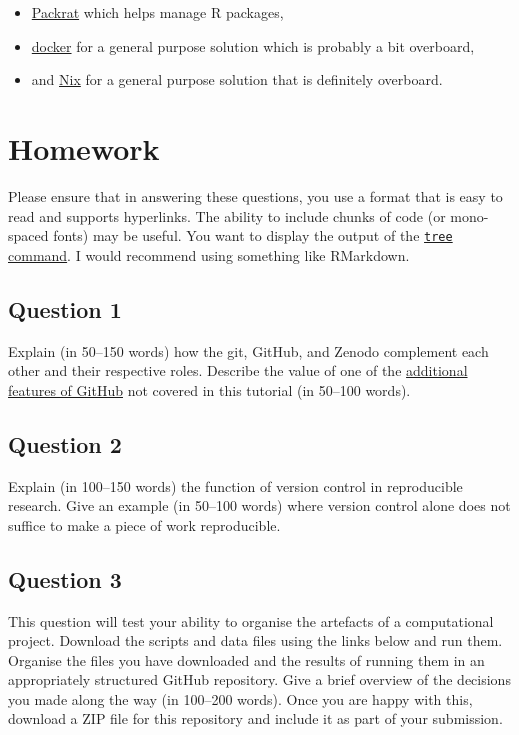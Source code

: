 \documentclass[11pt,onecolumn]{scrartcl}
\begin{document}
\begin{itemize}
\item \href{http://rstudio.github.io/packrat/}{Packrat} which helps manage R packages,
\item \href{https://www.docker.com/}{docker} for a general purpose solution which is probably a bit overboard,
\item and \href{https://nixos.org/}{Nix} for a general purpose solution that is definitely overboard.
\end{itemize}

\section{Homework}
\label{sec:org2dd58c7}

Please ensure that in answering these questions, you use a format that is easy
to read and supports hyperlinks. The ability to include chunks of code (or
mono-spaced fonts) may be useful. You want to display the output of the \href{https://en.wikipedia.org/wiki/Tree\_(command)}{\texttt{tree}
command}. I would recommend using something like RMarkdown.

\subsection{Question 1}
\label{sec:org012eacd}

Explain (in 50--150 words) how the git, GitHub, and Zenodo complement each other
and their respective roles. Describe the value of one of the \hyperref[sec:orgafdada1]{additional features
of GitHub} not covered in this tutorial (in 50--100 words).

\subsection{Question 2}
\label{sec:org7455dc9}

Explain (in 100--150 words) the function of version control in reproducible
research. Give an example (in 50--100 words) where version control alone does
not suffice to make a piece of work reproducible.

\subsection{Question 3}
\label{sec:org5c8ce18}

This question will test your ability to organise the artefacts of a
computational project. Download the scripts and data files using the links below
and run them. Organise the files you have downloaded and the results of running
them in an appropriately structured GitHub repository. Give a brief overview of
the decisions you made along the way (in 100--200 words). Once you are happy
with this, download a ZIP file for this repository and include it as part of
your submission.
\end{document}
